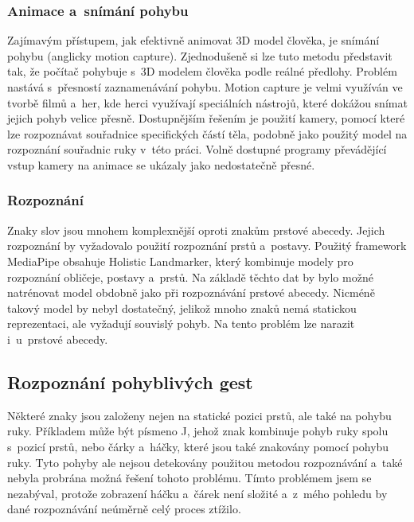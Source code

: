 \documentclass[
  master,
  program=ainfvs,
  biblatex,
  figures=true,
  tables=false,
  sourcecodes=true,
  glossaries,
  index
]{kidiplom}
\begin{document}
        \subsubsection{Animace a~snímání pohybu}
            Zajímavým přístupem, jak efektivně animovat 3D model člověka, je snímání pohybu (anglicky motion capture). Zjednodušeně si lze tuto metodu představit tak, že počítač pohybuje s~3D modelem člověka podle reálné předlohy. Problém nastává s~přesností zaznamenávání pohybu. Motion capture je velmi využíván ve tvorbě filmů a~her, kde herci využívají speciálních nástrojů, které dokážou snímat jejich pohyb velice přesně. Dostupnějším řešením je použití kamery, pomocí které lze rozpoznávat souřadnice specifických částí těla, podobně jako použitý model na rozpoznání souřadnic ruky v~této práci. Volně dostupné programy převádějící vstup kamery na animace se ukázaly jako nedostatečně přesné.
            
        
        \subsubsection{Rozpoznání}
            Znaky slov jsou mnohem komplexnější oproti znakům prstové abecedy. Jejich rozpoznání by vyžadovalo použití rozpoznání prstů a~postavy. Použitý framework MediaPipe obsahuje Holistic Landmarker, který kombinuje modely pro rozpoznání obličeje, postavy a~prstů. Na základě těchto dat by bylo možné natrénovat model obdobně jako při rozpoznávání prstové abecedy. Nicméně takový model by nebyl dostatečný, jelikož mnoho znaků nemá statickou reprezentaci, ale vyžadují souvislý pohyb. Na tento problém lze narazit i~u~prstové abecedy.
            
     
    \subsection{Rozpoznání pohyblivých gest}
        Některé znaky jsou založeny nejen na statické pozici prstů, ale také na pohybu ruky. Příkladem může být písmeno J, jehož znak kombinuje pohyb ruky spolu s~pozicí prstů, nebo čárky a~háčky, které jsou také znakovány pomocí pohybu ruky. Tyto pohyby ale nejsou detekovány použitou metodou rozpoznávání a~také nebyla probrána možná řešení tohoto problému. Tímto problémem jsem se nezabýval, protože zobrazení háčku a~čárek není složité a~z~mého pohledu by dané rozpoznávání neúměrně celý proces ztížilo.

\clearpage
\end{document}
